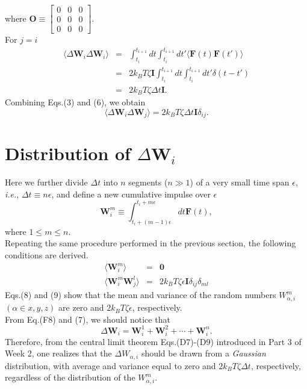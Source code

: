 \documentclass[a4paper,11pt]{article}
\begin{document}
where $\mathbf{O}\equiv\begin{bmatrix}0&0&0\\0&0&0\\0&0&0\end{bmatrix}$.\\
For $j=i$
\begin{eqnarray}
\langle\Delta\mathbf{W}_i\Delta\mathbf{W}_i\rangle
&=&\int_{t_i}^{t_{i+1}} dt\int_{t_i}^{t_{i+1}} dt'\langle\mathbf{F}(t)\mathbf{F}(t')\rangle\\
&=&2k_B T\zeta\mathbf{I} \int_{t_i}^{t_{i+1}} dt\int_{t_i}^{t_{i+1}} dt'
\delta(t-t')\\
&=&2k_B T\zeta\Delta t\mathbf{I}.
\end{eqnarray}
Combining Eqs.(3) and (6), we obtain
\begin{equation}
\langle \Delta \mathbf{W}_i\Delta \mathbf{W}_j\rangle = {2k_B T\zeta}\Delta t\mathbf{I}\delta_{ij} .
\tag{F11}
\end{equation}

\section{Distribution of $\Delta\mathbf{W}_i$}

Here we further divide $\Delta t$ into $n$ segments ($n\gg1$) of a
very small time span $\epsilon$, {\it i.e.}, $\Delta t \equiv n\epsilon$, and 
define a new cumulative impulse over $\epsilon$
\begin{equation}
\mathbf{W}^m_i
\equiv\int_{t_i+(m-1)\epsilon}^{t_{i}+m\epsilon} dt\mathbf{F}(t),
\end{equation}
where $1\le m\le n$.\\
Repeating the same procedure performed in the previous section, the following conditions are derived.
\begin{eqnarray}
\langle\mathbf{W}^m_i\rangle&=&\mathbf{0}\\
\langle \mathbf{W}^m_i\mathbf{W}^l_j\rangle &=& {2k_B T\zeta}\epsilon\mathbf{I}\delta_{ij}\delta_{ml}
\end{eqnarray}
Eqs.(8) and (9) show that the mean and variance of the random numbers $W^m_{\alpha,i}$ $(\alpha\in x,y,z)$ are zero and $2k_B T\zeta\epsilon$, respectively. \\
From Eq.(F8) and (7), we should notice that
\begin{equation}
\Delta\mathbf{W}_i
=\mathbf{W}^1_i+\mathbf{W}^2_i+\cdots+\mathbf{W}^n_i.
\end{equation}
Therefore, from the central limit theorem Eqs.(D7)-(D9) introduced in
Part 3 of Week 2, one realizes that the $\Delta W_{\alpha,i}$ should be
drawn from a \textit{Gaussian} distribution, with average and variance
equal to zero and $2k_B T\zeta\Delta t$, respectively, regardless of the
distribution of the $W^m_{\alpha,i}$.
\end{document}
